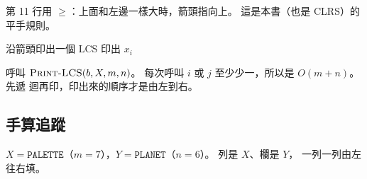 第 11 行用 $\ge$：上面和左邊一樣大時，箭頭指向上。 這是本書（也是 CLRS）的平手規則。

\begin{pseudo}[label=alg:dp-print-lcs]{沿箭頭印出一個 LCS}
        \State \Return
    \EndIf
        \State {}
        \State 印出 $x_i$
        \State {}
    \Else
        \State {}
    \EndIf
\EndProcedure
\end{pseudo}

呼叫 $\proc{Print-LCS}(b, X, m, n)$。 每次呼叫 $i$ 或 $j$ 至少少一，所以是 $O(m + n)$。 先遞
迴再印，印出來的順序才是由左到右。

\subsection{手算追蹤}
\label{sec:dp-lcs-trace}

$X = \texttt{PALETTE}$（$m = 7$），$Y = \texttt{PLANET}$（$n = 6$）。 列是 $X$、欄是 $Y$，
一列一列由左往右填。

